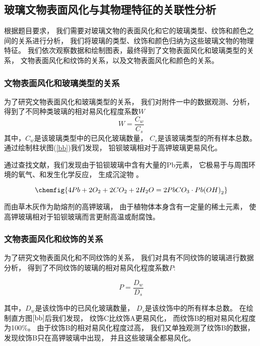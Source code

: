 \subsection{玻璃文物表面风化与其物理特征的关联性分析}
根据题目要求，
我们需要对玻璃文物的表面风化和它的玻璃类型、纹饰和颜色之间的关系进行分析，
我们将玻璃的类型、纹饰和颜色归纳为这些玻璃文物的物理特征。
我们依次观察数据和绘制图表，最终得到了文物表面风化和玻璃类型的关系，
文物表面风化和纹饰的关系，以及文物表面风化和颜色的关系。

\subsubsection{文物表面风化和玻璃类型的关系}

为了研究文物表面风化和玻璃类型的关系，
我们对附件一中的数据观测、分析，
得到了不同种类玻璃的相对易风化程度系数$W$
\begin{equation}
	W = \dfrac{C_w}{C_s}
\end{equation}
其中，$C_w$是该玻璃类型中的已风化玻璃数量，
$C_s$是该玻璃类型的所有样本总数。通过绘制柱状图(\ref{bb})我们发现，
铅钡玻璃相对于高钾玻璃更易风化。

通过查找文献，我们发现由于铅钡玻璃中含有大量的Pb元素，
它极易于与周围环境的氧气、和发生化学反应，
生成沉淀物 \cite{yijianzhanguoshiqibaleng}。

\begin{equation}
	\chemfig{4Pb + 2O_2 + 2CO_2 + 2H_2O = 2PbCO_3 \cdot Pb{(}OH{)}_2}
\end{equation}

而由草木灰作为助熔剂的高钾玻璃，
由于植物体本身含有一定量的稀土元素，
使高钾玻璃相对于铅钡玻璃而言更耐高温或耐腐蚀\cite{gudaibolicailiao}\cite{wedepohl2010chemical}。

\subsubsection{文物表面风化和纹饰的关系}
为了研究文物表面风化和不同纹饰的关系，
我们对具有不同纹饰的玻璃进行数据分析，
得到了不同纹饰的玻璃的相对易风化程度系数$P$:

\begin{equation}
	P = \dfrac{D_w}{D_s}
\end{equation}

其中，$D_w$是该纹饰中的已风化玻璃数量，
$D_s$是该纹饰中的所有样本总数。
在绘制直方图$\ref{bb}$后我们发现，
纹饰C比纹饰A更易风化，
而纹饰B的相对易风化程度为100\%。
由于纹饰B的相对易风化程度过高，
我们又单独观测了纹饰B的数据，
发现纹饰B只在高钾玻璃中出现，
并且这些玻璃全都易风化。

